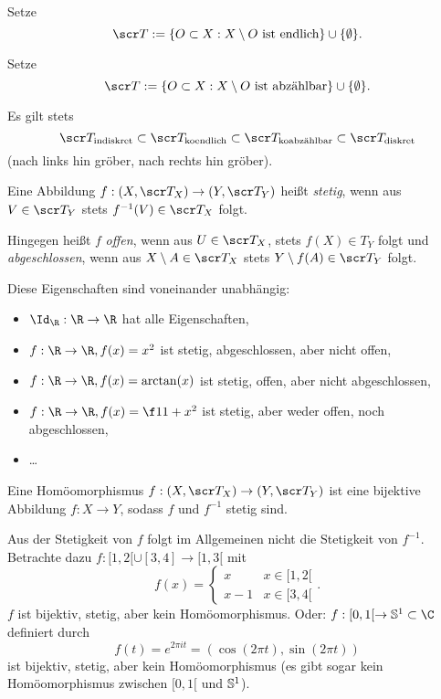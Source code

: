 \begin{ex}
	Setze
	\[
		\scr T
		:= \{ O \subset X : X \setminus O \text{ ist endlich} \} \cup \{\emptyset\}.
	\]
\end{ex}

\begin{ex}
	Setze
	\[
		\scr T
		:= \{ O \subset X : X \setminus O \text{ ist abzählbar} \} \cup \{ \emptyset \}.
	\]
\end{ex}

\begin{nt}
	Es gilt stets
	\[
		\scr T_{\text{indiskret}}
		\subset \scr T_{\text{koendlich}}
		\subset \scr T_{\text{koabzählbar}}
		\subset \scr T_{\text{diskret}}
	\]
	(nach links hin gröber, nach rechts hin gröber).
\end{nt}

\begin{df}
	Eine Abbildung $f: (X,\scr T_X) \to (Y, \scr T_Y)$ heißt \emph{stetig}, wenn aus $V \in \scr T_Y$ stets $f^{-1}(V) \in \scr T_X$ folgt.

	Hingegen heißt $f$ \emph{offen}, wenn aus $U \in \scr T_X$, stets $f(X) \in T_Y$ folgt und \emph{abgeschlossen}, wenn aus $X \setminus A \in \scr T_X$ stets $Y \setminus f(A) \in \scr T_Y$ folgt.
	\begin{nt}
		Diese Eigenschaften sind voneinander unabhängig:
		\begin{itemize}
			\item
				$\Id_\R: \R \to \R$ hat alle Eigenschaften,
			\item
				$f: \R \to \R, f(x) = x^2$ ist stetig, abgeschlossen, aber nicht offen,
			\item
				$f: \R \to \R, f(x) = \arctan(x)$ ist stetig, offen, aber nicht abgeschlossen,
			\item
				$f: \R \to \R, f(x) = \f 1{1+x^2}$ ist stetig, aber weder offen, noch abgeschlossen,
			\item
				\dots
		\end{itemize}
	\end{nt}
\end{df}

\begin{df}
	Eine Homöomorphismus $f: (X,\scr T_X) \to (Y, \scr T_Y)$ ist eine bijektive Abbildung $f: X \to Y$, sodass $f$ und $f^{-1}$ stetig sind.
\end{df}

\begin{nt}
	Aus der Stetigkeit von $f$ folgt im Allgemeinen nicht die Stetigkeit von $f^{-1}$.
	Betrachte dazu $f: [1,2[ \cup [3,4] \to [1,3[$ mit
	\[
		f(x) = \begin{cases}
			x & x \in [1,2[ \\
			x - 1 & x \in [3,4[
		\end{cases}.
	\]
	$f$ ist bijektiv, stetig, aber kein Homöomorphismus.
	Oder: $f : [0,1[ \to \S^1 \subset \C$ definiert durch
	\[
		f(t)
		= e^{2\pi i t}
		= (\cos (2\pi t), \sin (2\pi t))
	\]
	ist bijektiv, stetig, aber kein Homöomorphismus (es gibt sogar kein Homöomorphismus zwischen $[0,1[$ und $\S^1$).
\end{nt}


